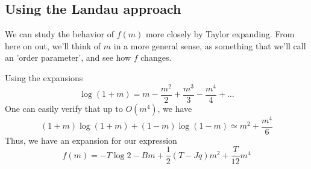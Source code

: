 \subsection{Using the Landau approach} 
We can study the behavior of $f(m)$ more closely by Taylor expanding. From here on out, we'll think of $m$ in a more general sense, as something that we'll call an 'order parameter', and see how $f$ changes. 

Using the expansions 
\[ 
	\log (1+ m) = m - \frac{ m^2}{2} + \frac{m^3}{ 3} - \frac{ m^4}{ 4}  + \dots 
\] 
One can easily verify that up to $O(m^ 4) $, we have 
\[ 
	(1 + m ) \log ( 1 + m) + ( 1 - m ) \log ( 1 - m ) \simeq  m ^2 + \frac{ m^4}{ 6} 
\] 
Thus, we have an expansion for our expression 
\[
	f(m ) =  - T\log 2  - Bm + \frac{1}{ 2} ( T  - Jq ) m^ 2 + \frac{T}{ 12} m^4 
\] 


